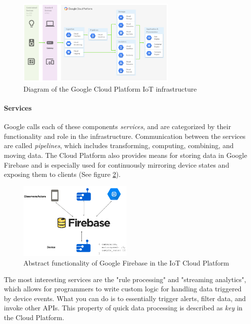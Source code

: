 \begin{figure}[h!]
	\centering
	\includegraphics[width=0.7\textwidth]{figures/gcp/infrastructure.png}
	\caption{Diagram of the Google Cloud Platform IoT infrastructure}
	\label{fig:gcp:infrastructure}
\end{figure}

\paragraph{Services}
Google calls each of these components \textit{services}, and are categorized by their functionality and role in the infrastructure. Communication between the services are called \textit{pipelines}, which includes transforming, computing, combining, and moving data. The Cloud Platform also provides means for storing data in Google Firebase\cite{website:firebase}
and is especially used for continuously mirroring device states and exposing them to clients (See figure \ref{fig:gcp:firebase}).

\begin{figure}[h!]
	\centering
	\includegraphics[width=0.5\textwidth]{figures/gcp/firebase.png}
	\caption{Abstract functionality of Google Firebase in the IoT Cloud Platform}
	\label{fig:gcp:firebase}
\end{figure}

The most interesting services are the "rule processing" and "streaming analytics", which allows for programmers to write custom logic for handling data triggered by device events. What you can do is to essentially trigger alerts, filter data, and invoke other APIs. This property of quick data processing is described as \textit{key} in the Cloud Platform. 

